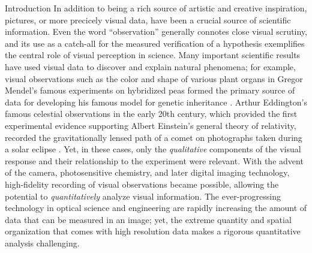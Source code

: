 \setlength{\parindent}{2ex}
\begin{chapter}{Introduction}\label{chapter:introduction}
  In addition to being a rich source of artistic and creative inspiration, pictures, or more precicely visual data, have been a crucial source of scientific information.
  Even the word ``observation'' generally connotes close visual scrutiny, and its use as a catch-all for the measured verification of a hypothesis exemplifies the central role of visual perception in science.
  Many important scientific results have used visual data to discover and explain natural phenomena; for example, visual observations such as the color and shape of various plant organs in Gregor Mendel's famous experiments on hybridized peas formed the primary source of data for developing his famous model for genetic inheritance \citep{mendel????}.
  Arthur Eddington's famous celestial observations in the early 20th century, which provided the first experimental evidence supporting Albert Einstein's general theory of relativity, recorded the gravitationally lensed path of a comet on photographs taken during a solar eclipse \citep{eddington1902}.
  Yet, in these cases, only the \emph{qualitative} components of the visual response and their relationship to the experiment were relevant.
  With the advent of the camera, photosensitive chemistry, and later digital imaging technology, high-fidelity recording of visual observations became possible, allowing the potential to \emph{quantitatively} analyze visual information.
  The ever-progressing technology in optical science and engineering are rapidly increasing the amount of data that can be measured in an image; yet, the extreme quantity and spatial organization that comes with high resolution data makes a rigorous quantitative analysis challenging.


\end{chapter}
